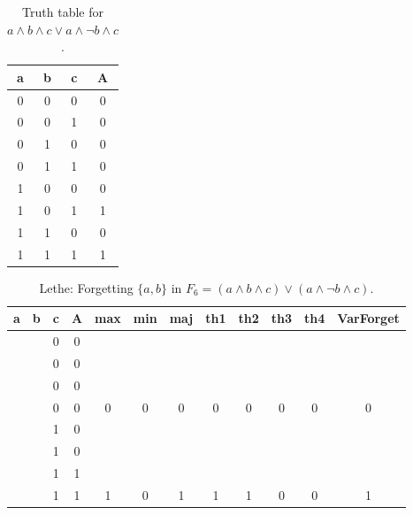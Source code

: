 \begin{table}[!tb]
    \centering
    \begin{tabular}{|c|c|c|c|}
        \hline
        \textbf{a} & \textbf{b} & \textbf{c} & \textbf{A} \\ \hline
        0 & 0 & 0 & 0 \\ \hline
        0 & 0 & 1 & 0 \\ \hline
        0 & 1 & 0 & 0 \\ \hline
        0 & 1 & 1 & 0 \\ \hline
        1 & 0 & 0 & 0 \\ \hline
        1 & 0 & 1 & 1 \\ \hline
        1 & 1 & 0 & 0 \\ \hline
        1 & 1 & 1 & 1 \\ \hline
    \end{tabular}
    \caption{Truth table for $a \land b \land c \lor a \land \lnot b \land c$.}
    \label{tab:truthtab}
\end{table}

\begin{table}[!tb]
    \centering
    \begin{tabular}{|c|c|c|c|c|c|c|c|c|c|c|c|}
        \hline
        \textbf{a} & \textbf{b} & \textbf{c} & \textbf{A} & \textbf{max} & \textbf{min} & \textbf{maj} & \textbf{th1} & \textbf{th2} & \textbf{th3} & \textbf{th4} & \textbf{VarForget} \\ \hline
        \rowcolor{gray!40}  &  & 0 & 0 &  &  &  &  &  &  &  &  \\ \hline
        \rowcolor{gray!40}  &  & 0 & 0 &  &  &  &  &  &  &  &  \\ \hline
        \rowcolor{gray!40}  &  & 0 & 0 &  &  &  &  &  &  &  &  \\ \hline
        \rowcolor{gray!40}  &  & 0 & 0 & 0 & 0 & 0 & 0 & 0 & 0 & 0 & 0 \\ \hline
        \rowcolor{blue!40}  &  & 1 & 0 &  &  &  &  &  &  &  &  \\ \hline
        \rowcolor{blue!40}  &  & 1 & 0 &  &  &  &  &  &  &  &  \\ \hline
        \rowcolor{blue!40}  &  & 1 & 1 &  &  &  &  &  &  &  &  \\ \hline
        \rowcolor{blue!40}  &  & 1 & 1 & 1 & 0 & 1 & 1 & 1 & 0 & 0 & 1 \\ \hline
    \end{tabular}
    \caption{Lethe: Forgetting $\{a, b\}$ in $F_{6} = (a \land b \land c) \lor (a \land \lnot b \land c)$.}
    \label{tab:lethe-F6-ab}
\end{table}
